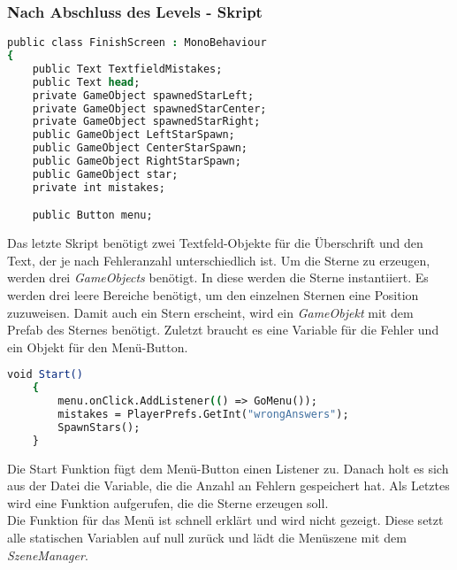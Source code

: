 \subsubsection{Nach Abschluss des Levels - Skript}
\begin{lstlisting}[language=csh, caption={FinishScreen.cs Variablendeklaration}]
public class FinishScreen : MonoBehaviour
{
	public Text TextfieldMistakes;
	public Text head;
	private GameObject spawnedStarLeft;
	private GameObject spawnedStarCenter;
	private GameObject spawnedStarRight;
	public GameObject LeftStarSpawn;
	public GameObject CenterStarSpawn;
	public GameObject RightStarSpawn;
	public GameObject star;
	private int mistakes;

	public Button menu;
\end{lstlisting}
Das letzte Skript benötigt zwei Textfeld-Objekte für die Überschrift und den Text, der je nach Fehleranzahl unterschiedlich ist. Um die Sterne zu erzeugen, werden drei \textit{GameObjects} benötigt. In diese werden die Sterne instantiiert. Es werden drei leere Bereiche benötigt, um den einzelnen Sternen eine Position zuzuweisen. Damit auch ein Stern erscheint, wird ein \textit{GameObjekt} mit dem Prefab des Sternes benötigt. Zuletzt braucht es eine Variable für die Fehler und ein Objekt für den Menü-Button.\\
\begin{lstlisting}[language=csh, caption={FinishScreen.cs Start-Funktion}]
	void Start()
	{
		menu.onClick.AddListener(() => GoMenu());
		mistakes = PlayerPrefs.GetInt("wrongAnswers");
		SpawnStars();
	}
\end{lstlisting}
Die Start Funktion fügt dem Menü-Button einen Listener zu. Danach holt es sich aus der Datei die Variable, die die Anzahl an Fehlern gespeichert hat. Als Letztes wird eine Funktion aufgerufen, die die Sterne erzeugen soll.\\
Die Funktion für das Menü ist schnell erklärt und wird nicht gezeigt. Diese setzt alle statischen Variablen auf null zurück und lädt die Menüszene mit dem \textit{SzeneManager}.\\
